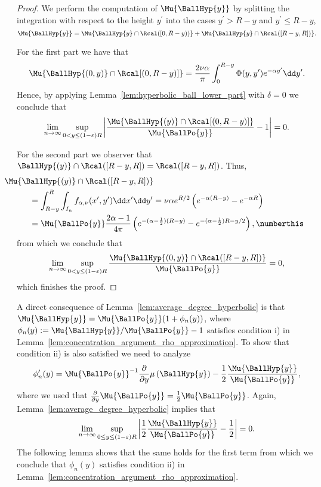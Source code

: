\begin{proof}
We perform the computation of $\Mu{\BallHyp{y}}$ by splitting the integration with respect to the height $y^\prime$ into the cases $y^\prime > R - y$ and $y^\prime \le R - y$,
\[
	\Mu{\BallHyp{y}} 
	= \Mu{\BallHyp{y} \cap \Rcal ([0,R - y))} + \Mu{\BallHyp{y} \cap \Rcal ([R - y, R])}.
\]

For the first part we have that
\[
	\Mu{\BallHyp{(0,y)} \cap\Rcal[(0,R-y)]} = \frac{2\nu \alpha}{\pi} \int_0^{R-y} \Phi(y,y^\prime) e^{-\alpha y^\prime}
	\dd y^\prime.
\]
Hence, by applying Lemma~\ref{lem:hyperbolic_ball_lower_part} with $\delta = 0$ we conclude that
\[
	\lim_{n \to \infty} \sup_{0 < y \le (1-\varepsilon)R} \left|
	\frac{\Mu{\BallHyp{(y)} \cap\Rcal[(0,R-y)]}}{\Mu{\BallPo{y}}} - 1\right| = 0.
\]

For the second part we observer that $\BallHyp{(y)} \cap \Rcal ([R - y, R])= \Rcal([R-y,R])$. 
Thus, 
\begin{align*}
	&\hspace{-30pt}\Mu{\BallHyp{(y)} \cap \Rcal ([R - y, R])} \\
	&= \int_{R - y}^{R} \int_{I_n} f_{\alpha,\nu}(x^\prime, y^\prime) \dd x^\prime \dd y^\prime
		= \nu \alpha e^{R/2}\left(e^{-\alpha(R - y)} - e^{-\alpha R}\right)\\
	&= \Mu{\BallPo{y}} \frac{2\alpha - 1}{4\pi} \left( e^{-(\alpha - \frac{1}{2})(R - y)}
		- e^{-(\alpha - \frac{1}{2})R - y/2}\right), \numberthis \label{eq:mu_hyperbolic_ball_part_1}
\end{align*}
from which we conclude that
\[
	\lim_{n \to \infty} \sup_{0 < y \le (1-\varepsilon)R} \frac{\Mu{\BallHyp{(0,y)} \cap \Rcal ([R - y, R])}}{\Mu{\BallPo{y}}} = 0,
\]
which finishes the proof.
\end{proof}

A direct consequence of Lemma~\ref{lem:average_degree_hyperbolic} is that $\Mu{\BallHyp{y}} = \Mu{\BallPo{y}}(1 + \phi_n(y))$, where $\phi_n(y) := \Mu{\BallHyp{y}}/\Mu{\BallPo{y}} - 1$ satisfies condition i) in Lemma~\ref{lem:concentration_argument_rho_approximation}. To show that condition ii) is also satisfied we need to analyze
\[
	\phi_n^\prime(y) = 
	\Mu{\BallPo{y}}^{-1} \frac{\partial}{\partial y} \mu\left(\BallHyp{y}\right) -  \frac{1}{2} \frac{\Mu{\BallHyp{y}}}{\Mu{\BallPo{y}}},
\]
where we used that $\frac{\partial}{\partial y}\Mu{\BallPo{y}} = \frac{1}{2}\Mu{\BallPo{y}}$. Again, Lemma~\ref{lem:average_degree_hyperbolic} implies that 
\[
	\lim_{n \to \infty} \sup_{0 \le y \le (1-\varepsilon)R} \left|\frac{1}{2} \frac{\Mu{\BallHyp{y}}}{\Mu{\BallPo{y}}}
	- \frac{1}{2}\right| = 0.
\]
The following lemma shows that the same holds for the first term from which we conclude that $\phi_n(y)$ satisfies condition ii) in Lemma~\ref{lem:concentration_argument_rho_approximation}.

